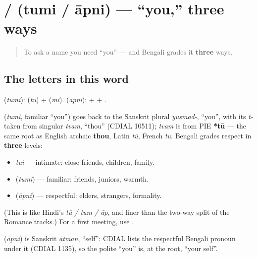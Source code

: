 \section[\texorpdfstring{\bn{তুমি} / \bn{আপনি} (tumi / āpni)}{তুমি / আপনি (tumi / āpni)}]{ /  (tumi / āpni) — \textquotedblleft{}you,\textquotedblright{} three ways}

\label{lesson:BN-C02-tumi-apni}



\begin{quote}
To ask a name you need \textquotedblleft{}you\textquotedblright{} — and Bengali grades it \textbf{three} ways.
\end{quote}

\subsection*{The letters in this word}
\textbf{} (\emph{tumi}): \textbf{} (\emph{tu}) + \textbf{} (\emph{mi}). \textbf{} (\emph{āpni}): \textbf{} + \textbf{} + \textbf{}.

\begin{cousinweb}
\textbf{} (\emph{tumi}, familiar \textquotedblleft{}you\textquotedblright{}) goes back to the Sanskrit plural \emph{yuṣmad-}, \textquotedblleft{}you\textquotedblright{}, with its \emph{t-} taken from singular \emph{tvam}, \textquotedblleft{}thou\textquotedblright{} (CDIAL 10511); \emph{tvam} is from PIE \textbf{*tū} — the same root as English archaic \textbf{thou}, Latin \emph{tū}, French \emph{tu}. Bengali grades respect in \textbf{three} levels:

\begin{itemize}
\raggedright
  \item \emph{tui} — intimate: close friends, children, family.
  \item \textbf{} (\emph{tumi}) — familiar: friends, juniors, warmth.
  \item \textbf{} (\emph{āpni}) — respectful: elders, strangers, formality.
\end{itemize}

(This is like Hindi's \emph{tū / tum / āp}, and finer than the two-way split of the Romance tracks.) For a first meeting, use \textbf{}.

\textbf{} (\emph{āpni}) is Sanskrit \emph{ātman}, \textquotedblleft{}self\textquotedblright{}: CDIAL lists the respectful Bengali pronoun under it (CDIAL 1135), so the polite \textquotedblleft{}you\textquotedblright{} is, at the root, \textquotedblleft{}your self\textquotedblright{}.
\end{cousinweb}

